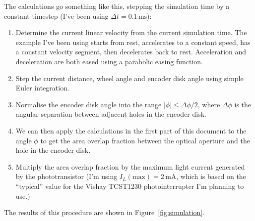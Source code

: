 \documentclass[a4paper,11pt,article]{memoir}
\begin{document}
The calculations go something like this, stepping the simulation time
by a constant timestep (I've been using $\Delta t = 0.1\,\mathrm{ms}$):
\begin{enumerate}
  \item{Determine the current linear velocity from the current
    simulation time. The example I've been using starts from rest,
    accelerates to a constant speed, has a constant velocity segment,
    then decelerates back to rest. Acceleration and deceleration are
    both eased using a parabolic easing function.}
  \item{Step the current distance, wheel angle and encoder disk angle
    using simple Euler integration.}
  \item{Normalise the encoder disk angle into the range $|\phi| \leq
    \Delta \phi / 2$, where $\Delta \phi$ is the angular separation
    between adjacent holes in the encoder disk.}
  \item{We can then apply the calculations in the first part of this
    document to the angle $\phi$ to get the area overlap fraction
    between the optical aperture and the hole in the encoder disk.}
  \item{Multiply the area overlap fraction by the maximum light
    current generated by the phototransistor (I'm using
    $I_L(\mathrm{max}) = 2\,\mathrm{mA}$, which is based on the
    ``typical'' value for the Vishay TCST1230 photointerrupter I'm
    planning to use.)}
\end{enumerate}
The results of this procedure are shown in
Figure~\ref{fig:simulation}.
\end{document}
